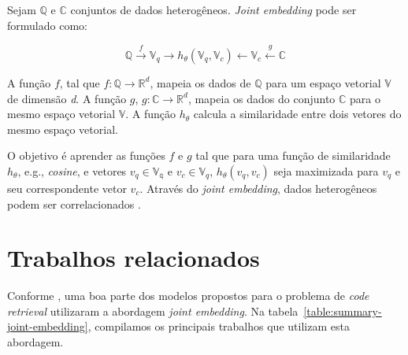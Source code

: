 Sejam $\mathbb{Q}$ e $\mathbb{C}$ conjuntos de dados heterogêneos. \textit{Joint embedding} pode ser formulado como:

\begin{equation}
        \mathbb{Q} \xrightarrow{f} \mathbb{V}_{q} \rightarrow h_{\theta}(\mathbb{V}_{q}, \mathbb{V}_{c}) \leftarrow \mathbb{V}_{c} \xleftarrow{g} \mathbb{C}
\end{equation}

A função $f$, tal que $f: \mathbb{Q} \rightarrow \mathbb{R}^{d}$, mapeia os dados de $\mathbb{Q}$ para um espaço vetorial $\mathbb{V}$ de dimensão \emph{d}. A função $g$, $g: \mathbb{C} \rightarrow \mathbb{R}^{d}$, mapeia os dados do conjunto $\mathbb{C}$ para o mesmo espaço vetorial $\mathbb{V}$. A função $h_{\theta}$ calcula a similaridade entre dois vetores do mesmo espaço vetorial.


O objetivo é aprender as funções $f$ e $g$ tal que para uma função de similaridade $h_{\theta}$, e.g., \textit{cosine}, e vetores $v_{q} \in \mathbb{V_q}$ e $v_{c} \in \mathbb{V}_q$,  $h_{\theta}(v_{q}, v_{c})$ seja maximizada para $v_{q}$ e seu correspondente vetor $v_{c}$.
Através do \textit{joint embedding}, dados heterogêneos podem ser correlacionados \citep{Gu-deep-code-search:2018, cambronero-deep-learning-code-search:2019}.

    

\section{Trabalhos relacionados}\label{sec:code-retrieval-trabalhos-relacionados}

Conforme \cite{cambronero-deep-learning-code-search:2019}, uma boa parte dos modelos propostos para o problema de \textit{code retrieval} utilizaram a abordagem \textit{joint embedding}. Na tabela~\ref{table:summary-joint-embedding}, compilamos os principais trabalhos que utilizam esta abordagem. 

